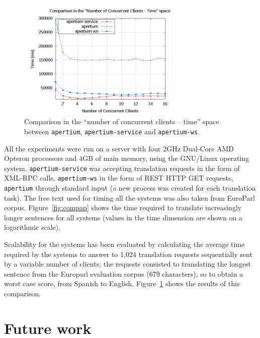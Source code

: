 \documentclass[11pt]{article}
\begin{document}
\begin{figure}[!ht]
\begin{center}
\includegraphics[width=7.75cm]{compmt}
\end{center}
\caption{Comparison in the ``number of concurrent clients -- time'' space between 
{\tt\small apertium}, {\tt\small apertium-service} and {\tt\small apertium-ws}.}
\label{fig:compmt}
\end{figure}

All the experiments were run on a server with four 2GHz Dual-Core AMD Opteron processors 
and 4GB of main memory, using the GNU/Linux operating system. {\tt\small apertium-service} 
was accepting translation requests in the form of XML-RPC calls, {\tt\small apertium-ws} 
in the form of REST HTTP GET requests, {\tt\small apertium} through standard input (a new 
process was created for each translation task). The free text used for timing all the systems 
was also taken from EuroParl corpus. Figure~\ref{fig:compap} shows the time required to 
translate increasingly longer sentences for all systems (values in the time dimension are 
shown on a logarithmic scale).

Scalability for the systems has been evaluated by calculating the average time required by the 
systems to answer to 1,024 translation requests sequentially sent by a variable number of 
clients; the requests consisted to translating the longest sentence from the Europarl evaluation 
corpus (679 characters), so to obtain a worst case score, from Spanish to English. Figure~\ref{fig:compmt} 
shows the results of this comparison.

\section{Future work} %
\end{document}
